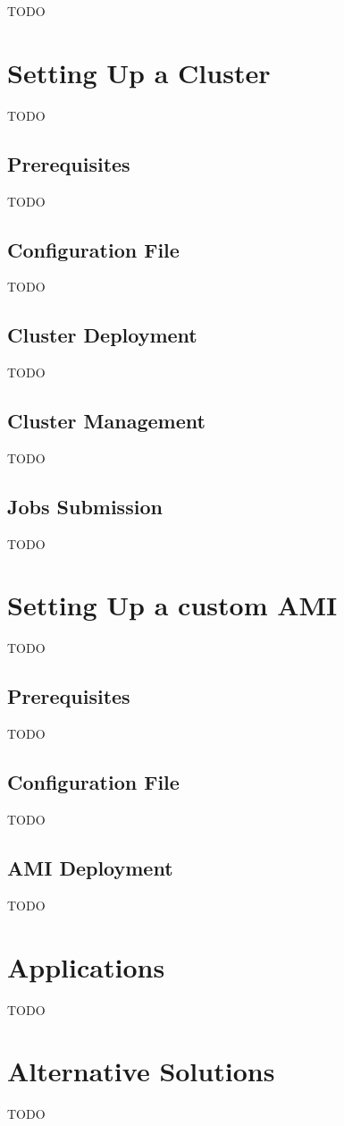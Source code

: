 TODO

\section{Setting Up a Cluster}

TODO

\subsection{Prerequisites}

TODO

\subsection{Configuration File}

TODO

\subsection{Cluster Deployment}

TODO

\subsection{Cluster Management}

TODO

\subsection{Jobs Submission}

TODO

\section{Setting Up a custom AMI}

TODO

\subsection{Prerequisites}

TODO

\subsection{Configuration File}

TODO

\subsection{AMI Deployment}

TODO

\section{Applications}

TODO

\section{Alternative Solutions}

TODO

